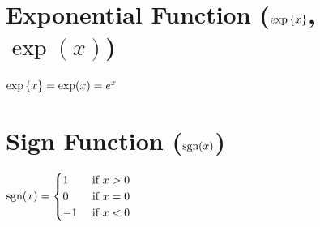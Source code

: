 \section{Exponential Function ($\exp\left\{x\right\}$, $\exp(x)$)}

$
    \exp\left\{x\right\} = \exp(x) = e^x
$





\section{Sign Function ($\text{sgn}(x)$)}

$
    \text{sgn}(x)
    = \begin{cases}
        1 & \text{ if } x>0 \\
        0 & \text{ if } x=0 \\
        -1 & \text{ if } x<0
    \end{cases}
$
\hfill \cite{statistics/book/Statistics-for-Data-Scientists/Maurits-Kaptein}





















